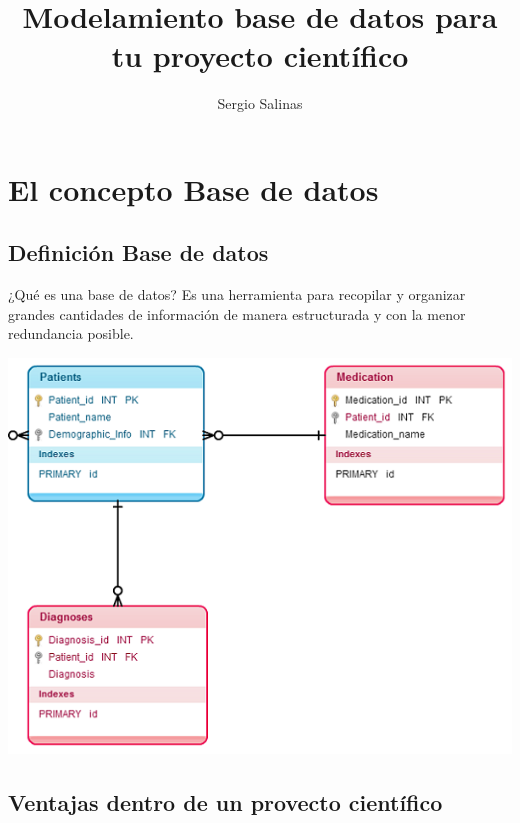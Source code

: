 \documentclass[11pt]{beamer}
\author{Sergio Salinas}
\title{Modelamiento base de datos para tu proyecto científico}
\begin{document}
\begin{frame}
\titlepage
\end{frame}

\begin{frame}
\tableofcontents
\end{frame}

\section{El concepto Base de datos}

\subsection{Definición Base de datos}

\begin{frame}{¿Qué es una base de datos?}
Es una herramienta para recopilar y organizar grandes cantidades de información de manera estructurada y con la menor redundancia posible.

\begin{center}
\includegraphics[scale=0.5]{images/relational-database-model1.png} 

\end{center}

\end{frame}

\subsection{Ventajas dentro de un provecto científico}
\end{document}
